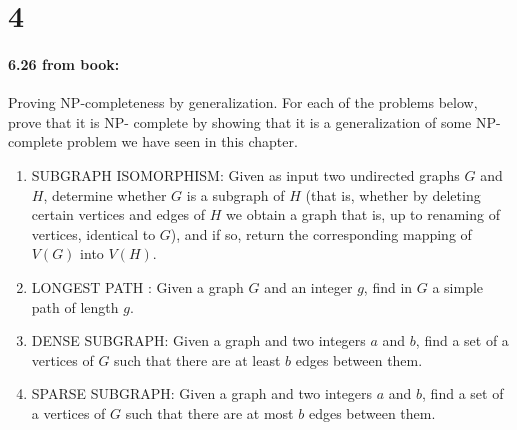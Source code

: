 \documentclass[12pt]{article}
\begin{document}
\section*{4}
\paragraph{6.26 from book:}
Proving NP-completeness by generalization. For each of the problems below, prove that it is NP-
complete by showing that it is a generalization of some NP-complete problem we have seen in
this chapter.
\begin{enumerate}
\item  SUBGRAPH ISOMORPHISM: Given as input two undirected graphs $G$
        and $H$, determine whether $G$ is a subgraph of $H$ (that is, whether by
        deleting certain vertices and edges of $H$ we obtain a graph that is, up
        to renaming of vertices, identical to $G$), and if so, return the
        corresponding mapping of $V(G)$ into $V(H)$.

\item LONGEST PATH :
        Given a graph $G$ and an integer $g$, find in $G$ a simple path
        of length $g$.

\item  DENSE SUBGRAPH: Given a graph and two integers $a$ and $b$, find
        a set of a vertices of $G$ such that there are at least $b$ edges
        between them.

\item SPARSE SUBGRAPH: Given a graph and two integers $a$ and $b$, find
        a set of a vertices of $G$ such that there are at most $b$ edges between
        them.
\end{enumerate}
\end{document}
